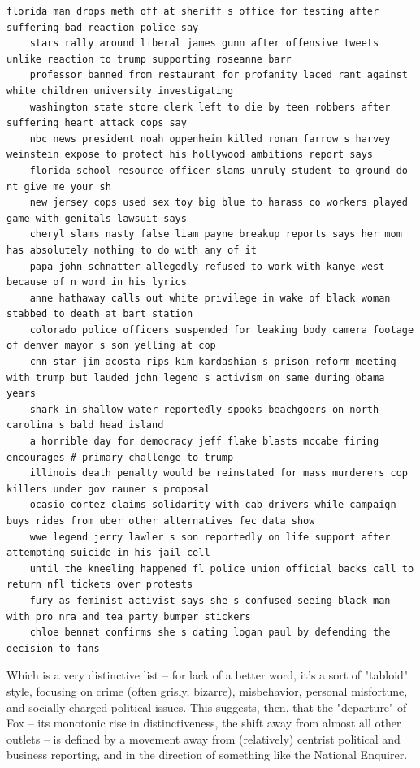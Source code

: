 \documentclass{scrartcl}
\begin{document}
\begin{lstlisting}[basicstyle=\tiny\hlfont]
    florida man drops meth off at sheriff s office for testing after suffering bad reaction police say
    stars rally around liberal james gunn after offensive tweets unlike reaction to trump supporting roseanne barr
    professor banned from restaurant for profanity laced rant against white children university investigating
    washington state store clerk left to die by teen robbers after suffering heart attack cops say
    nbc news president noah oppenheim killed ronan farrow s harvey weinstein expose to protect his hollywood ambitions report says
    florida school resource officer slams unruly student to ground do nt give me your sh
    new jersey cops used sex toy big blue to harass co workers played game with genitals lawsuit says
    cheryl slams nasty false liam payne breakup reports says her mom has absolutely nothing to do with any of it
    papa john schnatter allegedly refused to work with kanye west because of n word in his lyrics
    anne hathaway calls out white privilege in wake of black woman stabbed to death at bart station
    colorado police officers suspended for leaking body camera footage of denver mayor s son yelling at cop
    cnn star jim acosta rips kim kardashian s prison reform meeting with trump but lauded john legend s activism on same during obama years
    shark in shallow water reportedly spooks beachgoers on north carolina s bald head island
    a horrible day for democracy jeff flake blasts mccabe firing encourages # primary challenge to trump
    illinois death penalty would be reinstated for mass murderers cop killers under gov rauner s proposal
    ocasio cortez claims solidarity with cab drivers while campaign buys rides from uber other alternatives fec data show
    wwe legend jerry lawler s son reportedly on life support after attempting suicide in his jail cell
    until the kneeling happened fl police union official backs call to return nfl tickets over protests
    fury as feminist activist says she s confused seeing black man with pro nra and tea party bumper stickers
    chloe bennet confirms she s dating logan paul by defending the decision to fans
\end{lstlisting}

Which is a very distinctive list -- for lack of a better word, it's a sort of "tabloid" style, focusing on crime (often grisly, bizarre), misbehavior, personal misfortune, and socially charged political issues. This suggests, then, that the "departure" of Fox -- its monotonic rise in distinctiveness, the shift away from almost all other outlets -- is defined by a movement away from (relatively) centrist political and business reporting, and in the direction of something like the National Enquirer.
\end{document}
